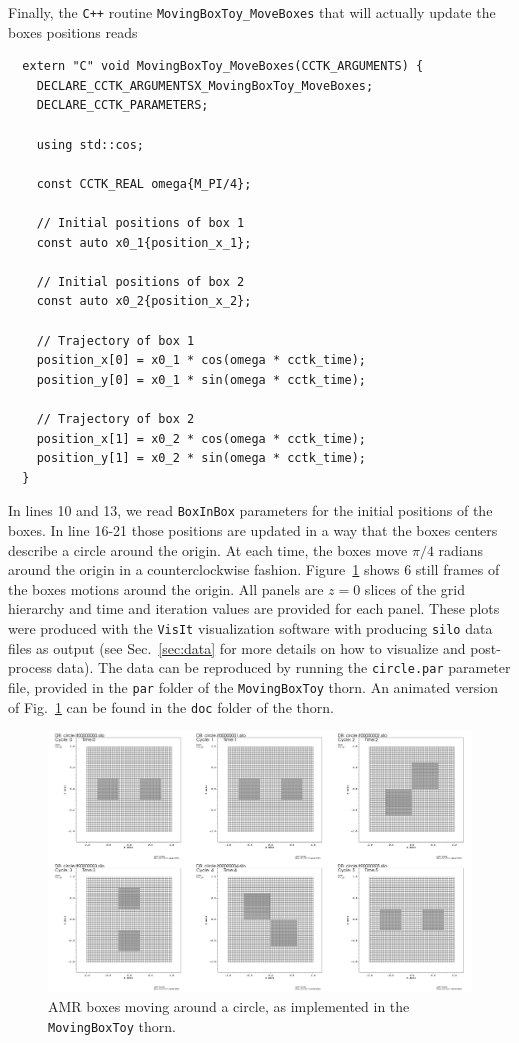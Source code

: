 Finally, the \texttt{C++} routine \texttt{MovingBoxToy\_MoveBoxes} that will actually update the boxes positions reads
%
\begin{lstlisting}
  extern "C" void MovingBoxToy_MoveBoxes(CCTK_ARGUMENTS) {
    DECLARE_CCTK_ARGUMENTSX_MovingBoxToy_MoveBoxes;
    DECLARE_CCTK_PARAMETERS;

    using std::cos;

    const CCTK_REAL omega{M_PI/4};

    // Initial positions of box 1
    const auto x0_1{position_x_1};

    // Initial positions of box 2
    const auto x0_2{position_x_2};

    // Trajectory of box 1
    position_x[0] = x0_1 * cos(omega * cctk_time);
    position_y[0] = x0_1 * sin(omega * cctk_time);

    // Trajectory of box 2
    position_x[1] = x0_2 * cos(omega * cctk_time);
    position_y[1] = x0_2 * sin(omega * cctk_time);
  }
\end{lstlisting}

In lines 10 and 13, we read \texttt{BoxInBox} parameters for the initial positions of the boxes. In line 16-21 those positions are updated in a way that the boxes centers describe a circle around the origin. At each time, the boxes move $\pi/4$ radians around the origin in a counterclockwise fashion. Figure~\ref{fig:boxes_circle} shows 6 still frames of the boxes motions around the origin. All panels are $z=0$ slices of the grid hierarchy and time and iteration values are provided for each panel. These plots were produced with the \texttt{VisIt} visualization software with \CarpetX\space producing \texttt{silo} data files as output (see Sec.~\ref{sec:data} for more details on how to visualize and post-process \CarpetX\space data). The data can be reproduced by running the \texttt{circle.par} parameter file, provided in the \texttt{par} folder of the \texttt{MovingBoxToy} thorn. An animated version of Fig.~\ref{fig:boxes_circle} can be found in the \texttt{doc} folder of the \CarpetX\space thorn.

\begin{figure}[ht]
  \begin{center}
      \includegraphics[width=\linewidth]{boxes_frames.png}
  \end{center}
  \caption{AMR boxes moving around a circle, as implemented in the \texttt{MovingBoxToy} thorn.}
  \label{fig:boxes_circle}
\end{figure}

